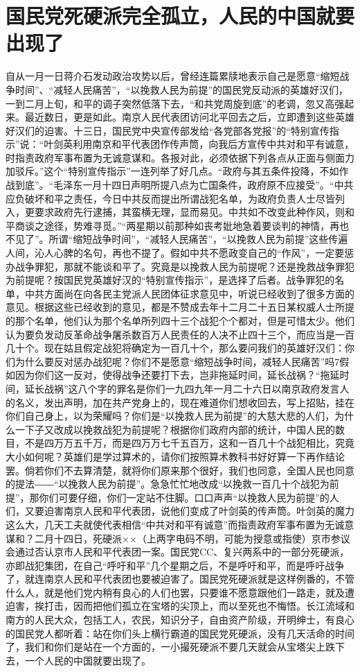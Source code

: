 \section[国民党死硬派完全孤立，人民的中国就要出现了（一九四九年二月十六日）]{国民党死硬派完全孤立，人民的中国就要出现了}


自从一月一日蒋介石发动政治攻势以后，曾经连篇累牍地表示自己是愿意“缩短战争时间”、“减轻人民痛苦”，“以挽救人民为前提”的国民党反动派的英雄好汉们，一到二月上旬，和平的调子突然低落下去，“和共党周旋到底”的老调，忽又高强起来。最近数日，更是如此。南京人民代表团访问北平回去之后，立即遭到这些英雄好汉们的迫害。十三日，国民党中央宣传部发给“各党部各党报”的“特别宣传指示”说：“叶剑英利用南京和平代表团作传声筒，向我后方宣传中共对和平有诚意，时指责政府军事布置为无诚意谋和。各报对此，必须依据下列各点从正面与侧面力加驳斥。”这个“特别宣传指示”一连列举了好几点。“政府与其五条件投降，不如作战到底”。“毛泽东一月十四日声明所提八点为亡国条件，政府原不应接受”。“中共应负破坏和平之责任，今日中共反而提出所谓战犯名单，为政府负责人士尽皆列入，更要求政府先行逮捕，其蛮横无理，显而易见。中共如不改变此种作风，则和平商谈之途径，势难寻觅。”“两星期以前那种如丧考妣地急着要谈判的神情，再也不见了”。所谓“缩短战争时间”，“减轻人民痛苦”，“以挽救人民为前提”这些传遍人间，沁人心脾的名句，再也不提了。假如中共不愿政变自己的“作风”，一定要惩办战争罪犯，那就不能谈和平了。究竟是以挽救人民为前提呢？还是挽救战争罪犯为前提呢？按国民党英雄好汉的“特别宣传指示”，是选择了后者。战争罪犯的名单，中共方面尚在向各民主党派人民团体征求意见中，听说已经收到了很多方面的意见。根据这些已经收到的意见，都是不赞成去年十二月二十五日某权威人士所提的那个名单，他们认为那个名单所列四十三个战犯个个都对，但是可惜太少。他们认为要负发动反革命战争屠杀数百万人民责任的人决不止四十三个，而应当是一百几十个。现在姑且假定战犯将确定为一百几十个，那么要问我们的英雄好汉们：你们为什么要反对惩办战犯呢？你们不是愿意“缩短战争时间，减轻人民痛苦”吗7假如因为你们这一反对，使得战争还要打下去，岂非拖延时间，延长战祸？“拖延时间，延长战祸”这八个字的罪名是你们一九四九年一月二十六日以南京政府发言人的名义，发出声明，加在共产党身上的，现在难道你们想收回去，写上招贴，挂在你们自己身上，以为荣耀吗？你们是“以挽救人民为前提”的大慈大悲的人们，为什么一下子又改成以挽救战犯为前提呢？根据你们政府内部的统计，中国人民的数目，不是四万万五千万，而是四万万七千五百万，这和一百几十个战犯相比，究竟大小如何呢？英雄们是学过算术的，请你们按照算术教科书好好算一下再作结论罢。倘若你们不去算清楚，就将你们原来那个很好，我们也同意，全国人民也同意的提法――“以挽救人民为前提”。急急忙忙地改成“以挽救一百几十个战犯为前提”，那你们可要仔细，你们一定站不住脚。口口声声“以挽救人民为前提”的人们，又要迫害南京人民和平代表团，说他们变成了叶剑英的传声筒。叶剑英的魔力这么大，几天工夫就使代表相信“中共对和平有诚意”而指责政府军事布置为无诚意谋和？二月十四日，死硬派××（上两字电码不明，可能为授意或指使）京市参议会通过否认京市人民和平代表团一案。国民党CC、复兴两系中的一部分死硬派，亦即战犯集团，在自己“呼吁和平”几个星期之后，不是呼吁和平，而是呼吁战争了，就连南京人民和平代表团也要被迫害了。国民党死硬派就是这样例番的，不管什么人，就是他们党内稍有良心的人们也罢，只要谁不愿意跟他们一路走，就及遭迫害，挨打击，因而把他们孤立在宝塔的尖顶上，而以至死也不悔悟。长江流域和南方的人民大众，包括工人，农民，知识分子，自由资产阶级，开明绅士，有良心的国民党人都听着：站在你们头上横行霸道的国民党死硬派，没有几天活命的时间了，我们和你们是站在一个方面的，一小撮死硬派不要几天就会从宝塔尖上跌下去，一个人民的中国就要出现了。

